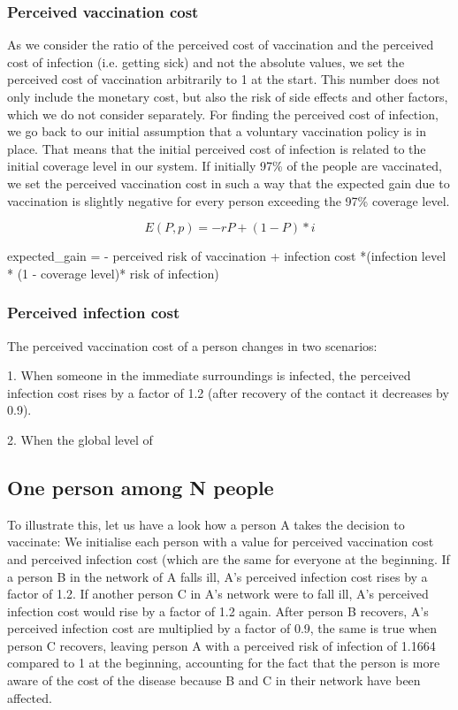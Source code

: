 \documentclass[11pt]{article}
\begin{document}
\subsubsection{Perceived vaccination cost} 
As we consider the ratio of the perceived cost of vaccination and the perceived cost of infection (i.e. getting sick) and not the absolute values, we set the perceived cost of vaccination arbitrarily to 1 at the start. This number does not only include the monetary cost, but also the risk of side effects and other factors, which we do not consider separately. For finding the perceived cost of infection, we go back to our initial assumption that a voluntary vaccination policy is in place. That means that the initial perceived cost of infection is related to the initial coverage level in our system. If initially 97\% of the people are vaccinated, we set the perceived vaccination cost in such a way that the expected gain due to vaccination is slightly negative for every person exceeding the 97\% coverage level.

\begin{equation}
E(P,p) = -rP +(1-P)*i
\end{equation}


expected\_gain = - perceived risk of vaccination + infection cost *(infection level * (1 - coverage level)* risk of infection) 

\vspace{14px}


\subsubsection{Perceived infection cost}
The perceived vaccination cost of a person changes in two scenarios:

1. When someone in the immediate surroundings is infected, the perceived infection cost rises by a factor of 1.2 (after recovery of the contact it decreases by 0.9).

2. When the global level of 

\subsection{One person among N people}
To illustrate this, let us have a look how a person A takes the decision to vaccinate: 
We initialise each person with a value for perceived vaccination cost and perceived infection cost (which are the same for everyone at the beginning. 
If a person B in the network of A falls ill, A's perceived infection cost rises by a factor of 1.2. If another person C in A's network were to fall ill, A's perceived infection cost would rise by a factor of 1.2 again. After person B recovers, A's perceived infection cost are multiplied by a factor of 0.9, the same is true when person C recovers, leaving person A with a perceived risk of infection of 1.1664 compared to 1 at the beginning, accounting for the fact that the person is more aware of the cost of the disease because B and C in their network have been affected. 
\end{document}
